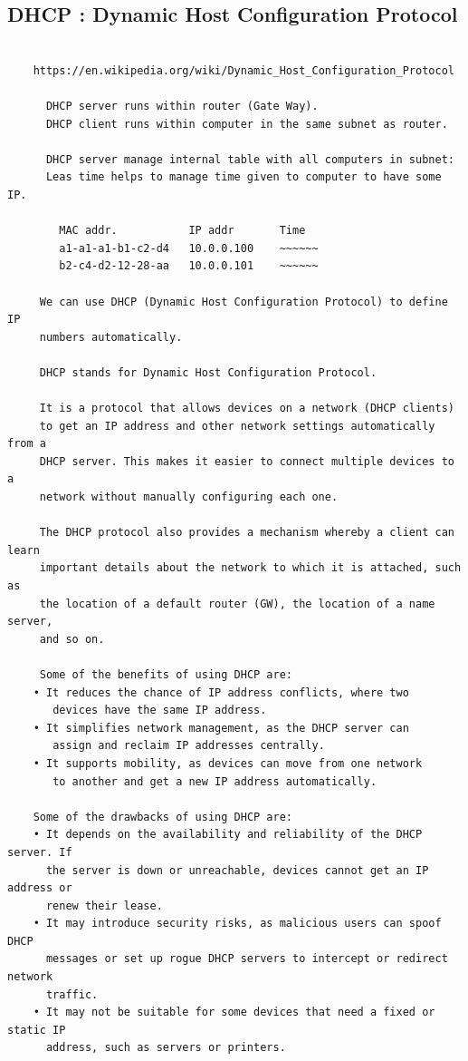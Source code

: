 \documentclass[a4paper,12pt]{article}
\begin{document}
\subsection{DHCP   : Dynamic Host Configuration Protocol}
\begin{verbatim}
     
    https://en.wikipedia.org/wiki/Dynamic_Host_Configuration_Protocol     
     
      DHCP server runs within router (Gate Way). 
      DHCP client runs within computer in the same subnet as router.
      
      DHCP server manage internal table with all computers in subnet:
      Leas time helps to manage time given to computer to have some IP. 
      
        MAC addr.           IP addr       Time
        a1-a1-a1-b1-c2-d4   10.0.0.100    ~~~~~~   
        b2-c4-d2-12-28-aa   10.0.0.101    ~~~~~~
     
     We can use DHCP (Dynamic Host Configuration Protocol) to define IP 
     numbers automatically.
     
     DHCP stands for Dynamic Host Configuration Protocol. 
     
     It is a protocol that allows devices on a network (DHCP clients) 
     to get an IP address and other network settings automatically from a 
     DHCP server. This makes it easier to connect multiple devices to a 
     network without manually configuring each one.  
     
     The DHCP protocol also provides a mechanism whereby a client can learn 
     important details about the network to which it is attached, such as 
     the location of a default router (GW), the location of a name server, 
     and so on.  
     
     Some of the benefits of using DHCP are:
    • It reduces the chance of IP address conflicts, where two 
       devices have the same IP address.
    • It simplifies network management, as the DHCP server can
       assign and reclaim IP addresses centrally.
    • It supports mobility, as devices can move from one network
       to another and get a new IP address automatically.  
     
    Some of the drawbacks of using DHCP are:
    • It depends on the availability and reliability of the DHCP server. If 
      the server is down or unreachable, devices cannot get an IP address or 
      renew their lease.
    • It may introduce security risks, as malicious users can spoof DHCP 
      messages or set up rogue DHCP servers to intercept or redirect network 
      traffic. 
    • It may not be suitable for some devices that need a fixed or static IP 
      address, such as servers or printers.
     

\end{verbatim}
\end{document}
